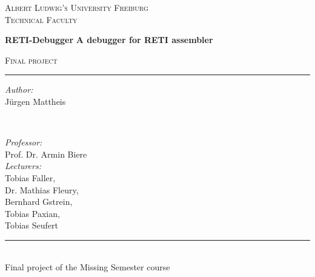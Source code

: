 \begin{titlepage}
  \vspace{1cm}
  \center
  \textsc{\LARGE Albert Ludwig's University Freiburg}\\[0.5cm]
  \textsc{\Large Technical Faculty}\\[2.0cm]

  \vspace{1cm}

	\begin{titlebox}{\center \huge \bfseries RETI-Debugger}
		\centering
		\bfseries \Large A debugger for RETI assembler
	\end{titlebox}

  \textsc{\large Final project}\\
  \rule{\linewidth}{0.1mm}

  \vspace{3cm}

  \begin{minipage}[t]{0.45\textwidth}
    \begin{flushleft} \large
      \emph{Author:}\\
      Jürgen Mattheis
    \end{flushleft}
  \end{minipage}
  ~
  \begin{minipage}[t]{0.45\textwidth}
    \begin{flushright} \large
      \emph{Professor:}\\
      Prof. Dr. Armin Biere\\[0.64cm]
      \emph{Lecturers:}\\
      Tobias Faller,\\ 
      Dr. Mathias Fleury,\\
      Bernhard Gstrein,\\
      Tobias Paxian,\\
      Tobias Seufert
    \end{flushright}
  \end{minipage}

  \vspace{2.5cm}
  \rule{11cm}{0.1mm}\\[0.25cm]
  \large{Final project of the Missing Semester course}
\end{titlepage}
